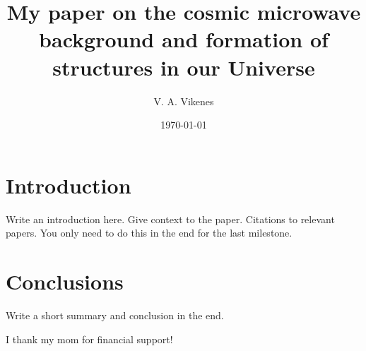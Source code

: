 \documentclass{aa}
\begin{document}
 
   \title{My paper on the cosmic microwave background and formation of structures in our Universe}

   \author{V. A. Vikenes}
 

   \date{\today}



   \maketitle

\section{Introduction}
Write an introduction here. Give context to the paper. Citations to relevant papers. You only need to do this in the end for the last milestone. %













\section{Conclusions}

Write a short summary and conclusion in the end. 

\begin{acknowledgements}
      I thank my mom for financial support!
\end{acknowledgements}
\end{document}
